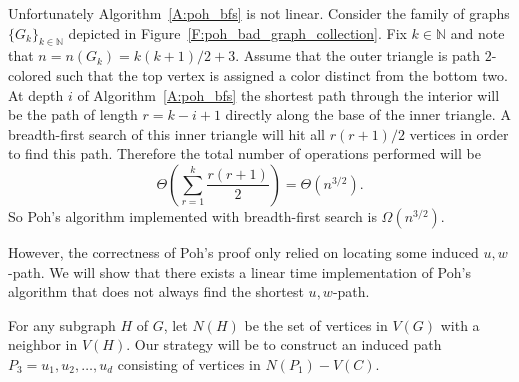 \documentclass[12pt,letterpaper]{article}
\theoremstyle{plain}
\theoremstyle{definition}
\theoremstyle{break}
\begin{document}
Unfortunately Algorithm~\ref{A:poh_bfs}
is not linear. Consider the family of
graphs $\{G_k\}_{k\in\mathbb{N}}$ depicted in
Figure~\ref{F:poh_bad_graph_collection}.
Fix $k\in\mathbb{N}$ and note that
$n=n(G_k)=k(k+1)/2+3$. Assume
that the outer triangle is path $2$-colored such that the top vertex is
assigned a color distinct from the bottom two. At depth $i$ of
Algorithm~\ref{A:poh_bfs}
the shortest path through the interior will be the path of length
$r=k-i+1$ directly along the base of the inner triangle. A breadth-first search
of this inner triangle will hit all $r(r+1)/2$ vertices in order to find this
path. Therefore the total number of operations performed will be
\[
    \Theta\left( \sum_{r=1}^k\frac{r(r+1)}{2} \right)=\Theta(n^{3/2}).
\]
So Poh's algorithm implemented with breadth-first search is $\Omega(n^{3/2})$.

However, the correctness of Poh's proof only relied on
locating some induced $u,w$-path.
We will show that there exists a linear time implementation of Poh's
algorithm that does not always find the shortest $u,w$-path.

For any subgraph $H$ of $G$, let $N(H)$ be the set of vertices in $V(G)$ with a
neighbor in $V(H)$. Our strategy will be to construct an induced
path $P_3=u_1,u_2,\ldots,u_d$ consisting of vertices in $N(P_1)-V(C)$.
\end{document}
